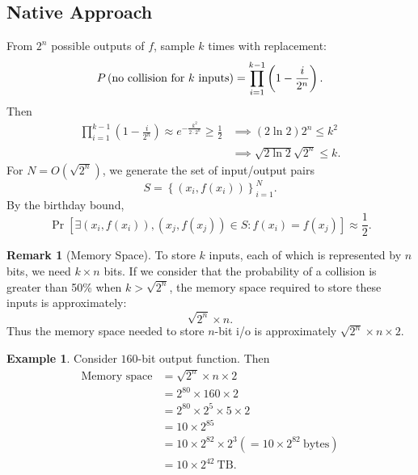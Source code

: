 \documentclass[12pt,openany]{book}
\theoremstyle{definition}
\newtheorem{remark}{Remark}[chapter]
\newtheorem{example}{Example}[chapter]
\newcommand{\set}[1]{\left\{#1\right\}}
\newcommand{\of}[1]{\left( #1 \right)}
\begin{document}
	\newpage
	\subsection{Native Approach}
	
	From $2^n$ possible outputs of $f$, sample $k$ times with replacement: \[
	P\of{\textnormal{no collision for $k$ inputs}}=\prod_{i=1}^{k-1}\of{1-\frac{i}{2^n}}.
	\]
	Then \begin{align*}
	\prod_{i=1}^{k-1}\of{1-\frac{i}{2^n}}\approx e^{-\frac{k^2}{2\cdot 2^n}}\geq\frac{1}{2}
	&\implies (2\ln2)2^n\leq k^2\\
	&\implies \sqrt{2\ln2}\sqrt{2^n}\leq k.
	\end{align*}
	For $N=O(\sqrt{2^n})$, we generate the set of input/output pairs \[
	S=\set{\of{x_i,f\of{x_i}}}_{i=1}^N.
	\] By the birthday bound, \[
	\Pr[\exists(x_i,f(x_i)),(x_j,f(x_j))\in S:f(x_i)=f(x_j)]\approx\frac{1}{2}.
	\]
	\vspace{8pt}
	\begin{remark}[Memory Space]
		To store $k$ inputs, each of which is represented by $n$ bits, we need $k \times n$ bits. If we consider that the probability of a collision is greater than 50\% when $k > \sqrt{2^n}$, the memory space required to store these inputs is approximately: \[
		\sqrt{2^n}\times n.
		\] Thus the memory space needed to store $n$-bit i/o is approximately $\sqrt{2^n}\times n\times 2$.
	\end{remark}
	\vspace{8pt}
	\begin{example}
		Consider $160$-bit output function. Then 
		\begin{align*}
		\text{Memory space} &= \sqrt{2^n} \times n \times 2 \\
		&= 2^{80} \times 160 \times 2 \\
		&= 2^{80} \times 2^5\times 5 \times 2 \\
		&= 10\times 2^{85}\\
		&= 10\times 2^{82} \times 2^3 (= 10\times 2^{82}\ \text{bytes})\\
		&= 10 \times 2^{42}\ \text{TB}.
		\end{align*}
	\end{example}
	
	\newpage
\end{document}

